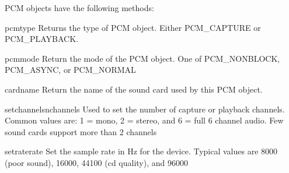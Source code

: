 PCM objects have the following methods:

\begin{methoddesc}[PCM]{pcmtype}{}
Returns the type of PCM object. Either PCM_CAPTURE or PCM_PLAYBACK.
\end{methoddesc}

\begin{methoddesc}[PCM]{pcmmode}{}
Return the mode of the PCM object. One of PCM_NONBLOCK, PCM_ASYNC, or PCM_NORMAL
\end{methoddesc}

\begin{methoddesc}[PCM]{cardname}{}
Return the name of the sound card used by this PCM object.
\end{methoddesc}

\begin{methoddesc}[PCM]{setchannels}{nchannels}
Used to set the number of capture or playback channels. Common values are: 1 = mono, 2 = stereo,
and 6 = full 6 channel audio. Few sound cards support more than 2 channels
\end{methoddesc}

\begin{methoddesc}[PCM]{setrate}{rate}
Set the sample rate in Hz for the device. Typical values are 8000 (poor sound), 16000, 44100 (cd quality),
and 96000
\end{methoddesc}


